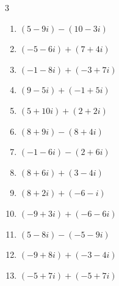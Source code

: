\begin{multicols}{3}
\begin{enumerate}
  \item $\displaystyle (5-9i) - (10-3i)$

        \phantom{$\displaystyle =-5-6i$}

  \item $\displaystyle (-5-6i) + (7+4i)$

        \phantom{$\displaystyle =2-2i$}

  \item $\displaystyle (-1-8i) + (-3+7i)$

        \phantom{$\displaystyle =-4-i$}

  \item $\displaystyle (9-5i) + (-1+5i)$

        \phantom{$\displaystyle =8$}

  \item $\displaystyle (5+10i) + (2+2i)$

        \phantom{$\displaystyle =7+12i$}

  \item $\displaystyle (8+9i) - (8+4i)$

        \phantom{$\displaystyle =5i$}

  \item $\displaystyle (-1-6i) - (2+6i)$

        \phantom{$\displaystyle =-3-12i$}

  \item $\displaystyle (8+6i) + (3-4i)$

        \phantom{$\displaystyle =11+2i$}

  \item $\displaystyle (8+2i) + (-6-i)$

        \phantom{$\displaystyle =2+i$}

  \item $\displaystyle (-9+3i) + (-6-6i)$

        \phantom{$\displaystyle =-15-3i$}

  \item $\displaystyle (5-8i) - (-5-9i)$

        \phantom{$\displaystyle =10+i$}

  \item $\displaystyle (-9+8i) + (-3-4i)$

        \phantom{$\displaystyle =-12+4i$}

  \item $\displaystyle (-5+7i) + (-5+7i)$

        \phantom{$\displaystyle =-10+14i$}


\end{enumerate}
\end{multicols}
